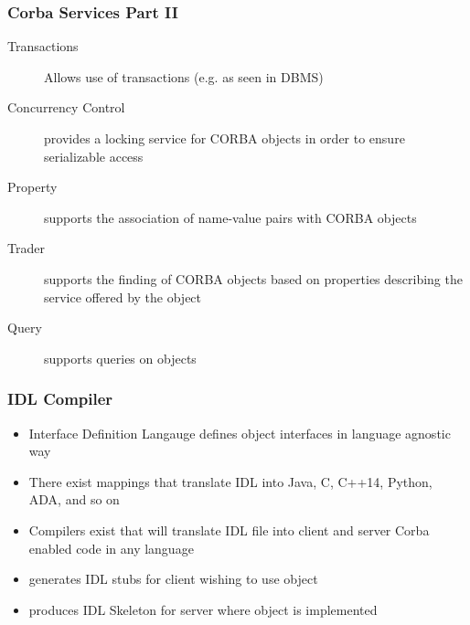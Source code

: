 \documentclass{beamer}
\begin{document}
        \begin{frame}
        	\frametitle{Corba Services Part II}
        	\begin{description}
		        \item[Transactions] 	Allows use of transactions (e.g. as seen in DBMS)
        		\item[Concurrency Control] 	provides a locking service for CORBA objects in order to ensure serializable access
        		\item[Property] 	supports the association of name-value pairs with CORBA objects
        		\item[Trader] 	supports the finding of CORBA objects based on properties describing the service offered by the object
        		\item[Query] 	supports queries on objects
        	\end{description}
        
        \end{frame}
             \begin{frame}
             	\frametitle{IDL Compiler}
             	\begin{itemize}
             		\item Interface Definition Langauge defines object interfaces in language agnostic way
             		\item There exist mappings that translate IDL into Java, C, C++14, Python, ADA, and so on
             		\item Compilers exist that will translate IDL file into client and server Corba enabled code in any language
             		\item generates IDL stubs for client wishing to use object
             		\item produces IDL Skeleton for server where object is implemented
             	\end{itemize}
             	
             \end{frame}     
\end{document}
